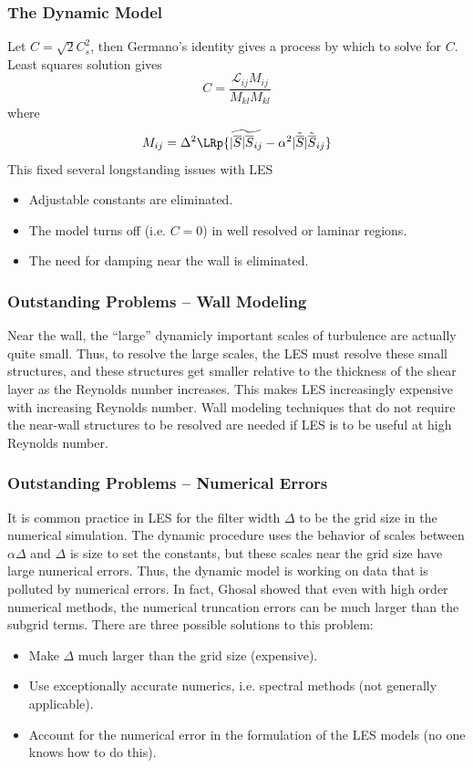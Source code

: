 \documentclass{beamer}
\begin{document}
\begin{frame}\frametitle{The Dynamic Model}
Let $C=\sqrt{2}C_s^2$, then Germano's identity gives a process by which to
solve for $C$. Least squares solution gives
\[
C=\frac{\mathcal{L}_{ij}M_{ij}}{M_{kl}M_{kl}}
\]
where 
\[
M_{ij}=\Delta^2\LRp{\widetilde{|\overline{S}|\overline{S}_{ij}}-\alpha^2|\tilde{\overline S}|\tilde{\overline S}_{ij}}
\]
This fixed several longstanding issues with LES
\begin{itemize}
\item Adjustable constants are eliminated.
\item The model turns off (i.e. $C=0$) in well resolved or laminar regions.
\item The need for damping near the wall is eliminated.
\end{itemize}
\end{frame}

\begin{frame}\frametitle{Outstanding Problems -- Wall Modeling}
Near the wall, the ``large'' dynamicly important scales of turbulence are
actually quite small. Thus, to resolve the large scales, the LES must resolve
these small structures, and these structures get smaller relative to the
thickness of the shear layer as the Reynolds number increases. This makes LES
increasingly expensive with increasing Reynolds number. Wall modeling
techniques that do not require the near-wall structures to be resolved are
needed if LES is to be useful at high Reynolds number.
\end{frame}

\begin{frame}\frametitle{Outstanding Problems -- Numerical Errors}
It is common practice in LES for the filter width $\Delta$ to be the grid size
in the numerical simulation. The dynamic procedure uses the behavior of scales
between $\alpha\Delta$ and $\Delta$ is size to set the constants, but these
scales near the grid size have large numerical errors. Thus, the dynamic model
is working on data that is polluted by numerical errors. In fact, Ghosal
showed that even with high order numerical methods, the numerical truncation
errors can be much larger than the subgrid terms. There are three possible
solutions to this problem:
\begin{itemize}
\item Make $\Delta$ much larger than the grid size (expensive).
\item Use exceptionally accurate numerics, i.e. spectral methods (not
generally applicable).
\item Account for the numerical error in the formulation of the LES models (no
one knows how to do this).
\end{itemize}
\end{frame}
\end{document}
